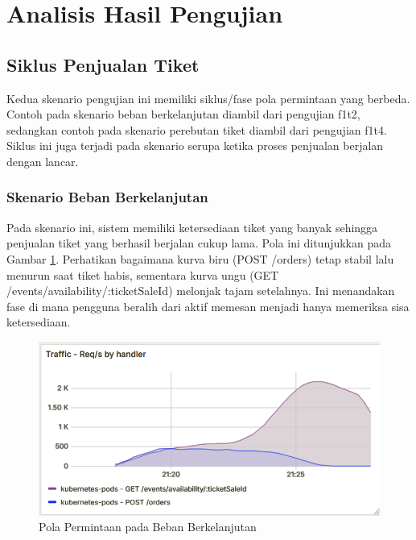 \section{Analisis Hasil Pengujian}

\subsection{Siklus Penjualan Tiket}

Kedua skenario pengujian ini memiliki siklus/fase pola permintaan yang berbeda. Contoh pada skenario beban berkelanjutan diambil dari pengujian f1t2, sedangkan contoh pada skenario perebutan tiket diambil dari pengujian f1t4. Siklus ini juga terjadi pada skenario serupa ketika proses penjualan berjalan dengan lancar.

\subsubsection{Skenario Beban Berkelanjutan}

Pada skenario ini, sistem memiliki ketersediaan tiket yang banyak sehingga penjualan tiket yang berhasil berjalan cukup lama. Pola ini ditunjukkan pada Gambar \ref{fig:pattern-stress-traffic}. Perhatikan bagaimana kurva biru (POST /orders) tetap stabil lalu menurun saat tiket habis, sementara kurva ungu (GET /events/availability/:ticketSaleId) melonjak tajam setelahnya. Ini menandakan fase di mana pengguna beralih dari aktif memesan menjadi hanya memeriksa sisa ketersediaan.

\begin{figure}[H]
    \centering
    \includegraphics[width=1\textwidth]{resources/chapter-4/pattern-stress-traffic.png}
    \caption{Pola Permintaan pada Beban Berkelanjutan}
    \label{fig:pattern-stress-traffic}
\end{figure}

